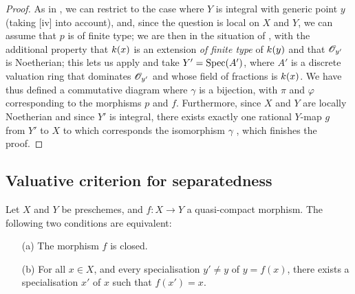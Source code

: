 \begin{proof}
\label{proof-II.7.1.9}
As in , we can restrict to the case where $Y$ is integral with generic point $y$ (taking [iv] into account), and, since the question is local on $X$ and $Y$, we can assume that $p$ is of finite type;
we are then in the situation of , with the additional property that $k(x)$ is an extension \emph{of finite type} of $k(y)$  and that $\mathscr{O}_{y'}$ is Noetherian;
this lets us apply  and take $Y'=\operatorname{Spec}(A')$, where $A'$ is a discrete valuation ring that dominates $\mathscr{O}_{y'}$ and whose field of fractions is $k(x)$.
We have thus defined a commutative diagram  where $\gamma$ is a bijection, with $\pi$ and $\varphi$ corresponding to the morphisms $p$ and $f$.
Furthermore, since $X$ and $Y$ are locally Noetherian  and since $Y'$ is integral, there exists exactly one rational $Y$-map $g$ from $Y'$ to $X$ to which corresponds the isomorphism $\gamma$ , which finishes the proof.
\end{proof}

\subsection{Valuative criterion for separatedness}
\label{subsection:II.7.2}

\begin{proposition}[7.2.1]
\label{II.7.2.1}
Let $X$ and $Y$ be preschemes, and $f:X\to Y$ a quasi-compact morphism.
The following two conditions are equivalent:
\begin{enumerate}
    \item[\rm{(a)}] The morphism $f$ is closed.
    \item[\rm{(b)}] For all $x\in X$, and every specialisation $y'\neq y$ of $y=f(x)$, there exists a specialisation $x'$ of $x$ such that $f(x')=x$.
\end{enumerate}
\end{proposition}


